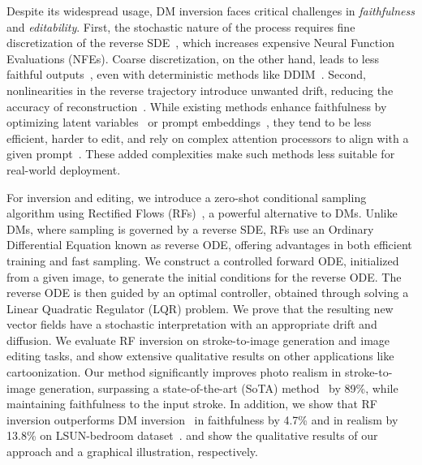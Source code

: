 \documentclass{article} %
\theoremstyle{plain}
\begin{document}
Despite its widespread usage, DM inversion faces critical challenges in \textit{faithfulness} and \textit{editability}. 
First, the stochastic nature of the process requires fine discretization of the reverse SDE~\citep{ddpm, songscore}, which increases
expensive Neural Function Evaluations (NFEs). 
Coarse discretization, on the other hand, leads to less faithful outputs~\citep{sdedit}, even with deterministic methods like DDIM~\citep{ddim, songscore}.
Second, nonlinearities in the reverse trajectory introduce unwanted drift, reducing the accuracy of reconstruction~\citep{karras2024analyzing}.
While existing methods enhance faithfulness by optimizing latent variables~\citep{stsl} or prompt embeddings~\citep{nti,negprompt}, they tend to be less efficient, harder to edit, and rely on complex attention processors to align with a given prompt~\citep{p2p,stsl}.
These added complexities make such methods less suitable for real-world deployment. 


For inversion and editing, we introduce a zero-shot conditional sampling algorithm using Rectified Flows (RFs)~\citep{rectflow, interpolant, lipman2022flow, sd3}, a powerful alternative to DMs. %
Unlike DMs, where sampling is governed by a reverse SDE, RFs use an Ordinary Differential Equation known as reverse ODE, offering advantages in both efficient training and fast sampling. 
We construct a controlled forward ODE, initialized from a given image, to generate the initial conditions for the reverse ODE. 
The reverse ODE is then guided by an optimal controller, obtained through solving a Linear Quadratic Regulator (LQR) problem. 
We prove that the resulting new vector fields have a stochastic interpretation with an appropriate drift and diffusion. 
We evaluate RF inversion on stroke-to-image generation and image editing tasks, and show extensive qualitative results on other applications like cartoonization.
Our method significantly improves photo realism in stroke-to-image generation, surpassing a state-of-the-art (SoTA) method~\citep{nti} by 89\%, while maintaining faithfulness to the input stroke. 
In addition, we show that RF inversion outperforms DM inversion~\citep{sdedit} in faithfulness by 4.7\% and in realism by 13.8\% on LSUN-bedroom dataset~\citep{lsun}. 
 and   show the qualitative results of our approach and a graphical illustration, respectively. 
\end{document}
